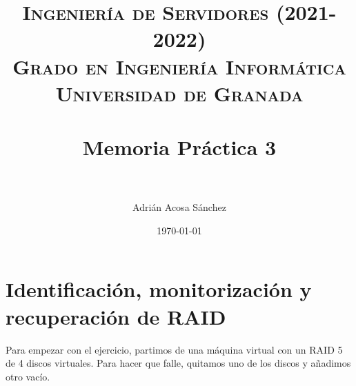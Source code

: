 


\title{	
\normalfont \normalsize 
\textsc{\textbf{Ingeniería de Servidores (2021-2022)} \\ Grado en Ingeniería Informática \\ Universidad de Granada} \\ [25pt] %
\horrule{0.5pt} \\[0.4cm] %
\huge Memoria Práctica 3 \\ %
\horrule{2pt} \\[0.5cm] %
}

\author{Adrián Acosa Sánchez} %

\date{\normalsize\today} %




\maketitle %

\newpage %

\tableofcontents %

\newpage


\section{Identificación, monitorización y recuperación de RAID}

Para empezar con el ejercicio, partimos de una máquina virtual con un RAID 5 de 4 discos virtuales. Para hacer que falle, quitamos uno de los discos y añadimos otro vacío.

